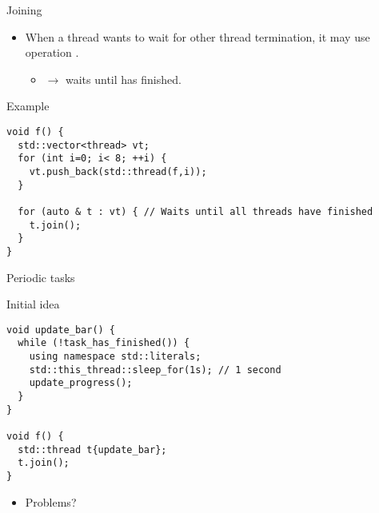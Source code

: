 \begin{frame}[t,fragile]{Joining}
\begin{itemize}
  \item When a thread wants to wait for other thread termination, it may use operation .
    \begin{itemize}
      \item {} $\rightarrow$ waits until  has finished.
    \end{itemize}
\end{itemize}
\begin{block}{Example}
\begin{lstlisting}
void f() {
  std::vector<thread> vt;
  for (int i=0; i< 8; ++i) {
    vt.push_back(std::thread(f,i));
  }

  for (auto & t : vt) { // Waits until all threads have finished
    t.join();
  }
}
\end{lstlisting}
\end{block}
\end{frame}

\begin{frame}[t,fragile]{Periodic tasks}
\begin{block}{Initial idea}
\begin{lstlisting}
void update_bar() {
  while (!task_has_finished()) {
    using namespace std::literals;
    std::this_thread::sleep_for(1s); // 1 second
    update_progress();
  }
}

void f() {
  std::thread t{update_bar};
  t.join();
}
\end{lstlisting}
\end{block}
\begin{itemize}
  \item Problems?
\end{itemize}
\end{frame}

